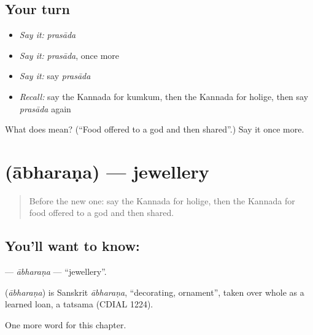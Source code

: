 \subsection*{Your turn}
\begin{itemize}
\raggedright
  \item \emph{Say it:} \emph{prasāda}
  \item \emph{Say it:} \emph{prasāda}, once more
  \item \emph{Say it:} say \emph{prasāda}
  \item \emph{Recall:} say the Kannada for kumkum, then the Kannada for holige, then say \emph{prasāda} again
\end{itemize}

\begin{tcolorbox}[breakable,colback=teal!4,colframe=teal!35!black,title={Before you move on}]
What does  mean? (\textquotedblleft{}Food offered to a god and then shared\textquotedblright{}.) Say it once more.
\end{tcolorbox}
\section[\texorpdfstring{\kn{ಆಭರಣ} (ābharaṇa)}{ಆಭರಣ (ābharaṇa)}]{ (ābharaṇa) — jewellery}

\label{lesson:KA-C262-abharana}



\begin{quote}
Before the new one: say the Kannada for holige, then the Kannada for food offered to a god and then shared.
\end{quote}

\subsection*{You'll want to know: }
\textbf{} — \emph{ābharaṇa} — \textquotedblleft{}jewellery\textquotedblright{}.

\begin{cousinweb}
\textbf{} (\emph{ābharaṇa}) is Sanskrit \emph{ābharaṇa}, \textquotedblleft{}decorating, ornament\textquotedblright{}, taken over whole as a learned loan, a tatsama (CDIAL 1224).
\end{cousinweb}

\begin{grammarlens}[title={What you've built}]
One more word for this chapter.
\end{grammarlens}

